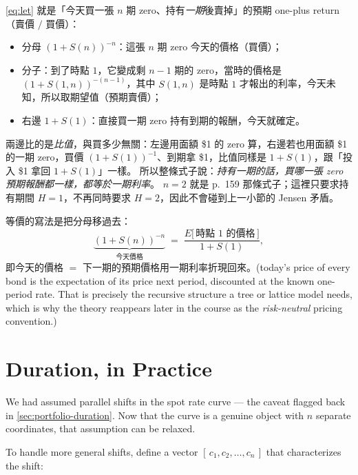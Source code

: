 \suppstart
\begin{remark}
	\eqref{eq:let} 就是「今天買一張 $n$ 期 zero、持有\emph{一期}後賣掉」的預期 one-plus return（賣價 $/$ 買價）：
	\begin{itemize}[nosep]
		\item 分母 $(1+S(n))^{-n}$：這張 $n$ 期 zero 今天的價格（買價）；
		\item 分子：到了時點 $1$，它變成剩 $n-1$ 期的 zero，當時的價格是 $(1+S(1,n))^{-(n-1)}$，其中 $S(1,n)$ 是時點 $1$ 才報出的利率，今天未知，所以取期望值（預期賣價）；
		\item 右邊 $1+S(1)$：直接買一期 zero 持有到期的報酬，今天就確定。
	\end{itemize}
	兩邊比的是\emph{比值}，與買多少無關：左邊用面額 \$1 的 zero 算，右邊若也用面額 \$1 的一期 zero，買價 $(1+S(1))^{-1}$、到期拿 \$1，比值同樣是 $1+S(1)$，跟「投入 \$1 拿回 $1+S(1)$」一樣。
	所以整條式子說：\emph{持有一期的話，買哪一張 zero 預期報酬都一樣，都等於一期利率}。
	$n=2$ 就是 p.~159 那條式子；這裡只要求持有期間 $H=1$，不再同時要求 $H=2$，因此不會碰到上一小節的 Jensen 矛盾。

	等價的寫法是把分母移過去：
	\[
		\underbrace{(1+S(n))^{-n}}_{\text{今天價格}} \;=\; \frac{E\bigl[\,\text{時點 } 1 \text{ 的價格}\,\bigr]}{1+S(1)} ,
	\]
	即今天的價格 $=$ 下一期的預期價格用一期利率折現回來。(today's price of every bond is the expectation of its price next period, discounted at the known one-period rate. 	That is precisely the recursive structure a tree or lattice model needs, which is why the theory reappears later in the course as the \emph{risk-neutral} pricing convention.)
\end{remark}
\suppend

\section{Duration, in Practice}
\label{sec:duration-practice}


We had assumed parallel shifts in the spot rate curve --- the caveat flagged back in \autoref{sec:portfolio-duration}.
Now that the curve is a genuine object with $n$ separate coordinates, that assumption can be relaxed.

To handle more general shifts, define a vector $[\,c_{1},c_{2},\ldots,c_{n}\,]$ that characterizes the shift:

